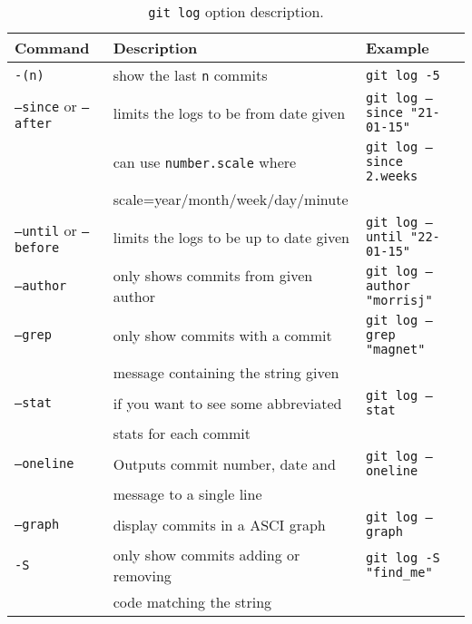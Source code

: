 \documentclass[11pt,a4paper]{report}
\begin{document}
\begin{table}[tbph]
	\begin{center}
		\begin{tabular}{@{}lll}
			\hline \hline
			\textbf{Command}                     & \textbf{Description}                     & \textbf{Example}           \\
			\hline
			\texttt{-(n)}                        & show the last \texttt{n} commits         & \texttt{git log -5}                 \\	
			\texttt{--since} or \texttt{--after} & limits the logs to be from date given    & \texttt{git log --since "21-01-15"} \\	
	               		                         & can use \texttt{number.scale} where      & \texttt{git log --since 2.weeks}    \\
	               		                         & scale=year/month/week/day/minute         & \\	
			\texttt{--until} or \texttt{--before}& limits the logs to be up to date given   & \texttt{git log --until "22-01-15"} \\	
			\texttt{--author}                    & only shows commits from given author     & \texttt{git log --author "morrisj"} \\	
			\texttt{--grep}                      & only show commits with a commit          & \texttt{git log --grep "magnet"}    \\
		                                         & message containing the string given      & \\	
			\texttt{--stat}                      & if you want to see some abbreviated      & \texttt{git log --stat}             \\
			                                     & stats for each commit                    & \\
			\texttt{--oneline}                   & Outputs commit number, date and          & \texttt{git log --oneline}          \\
			                                     &  message to a single line                & \\ 	
			\texttt{--graph}                     & display commits in a ASCI graph          & \texttt{git log --graph} \\	
			\texttt{-S}                          & only show commits adding or removing     & \texttt{git log -S "find\_me"} \\
			                                     & code matching the string                 & \\
			\hline \hline
		\end{tabular}\\
		\caption{\label{tab:commit_log} \texttt{git log} option description.}
	\end{center}
\end{table}
\end{document}
